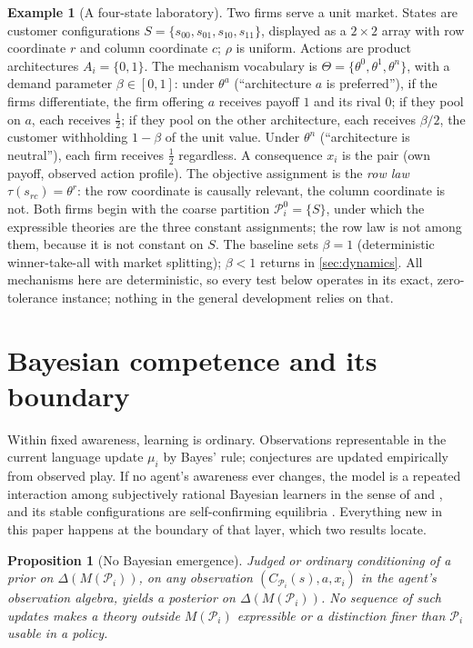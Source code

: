 \documentclass[11pt]{article}
\newtheorem{proposition}[assumption]{Proposition}
\theoremstyle{definition}
\newtheorem{example}{Example}
\begin{document}
\begin{example}[A four-state laboratory]
\label{ex:setup}
Two firms serve a unit market.  States are customer configurations
$S=\{s_{00},s_{01},s_{10},s_{11}\}$, displayed as a $2\times2$ array with row
coordinate $r$ and column coordinate $c$; $\rho$ is uniform.  Actions are
product architectures $A_i=\{0,1\}$.  The mechanism vocabulary is
$\Theta=\{\theta^0,\theta^1,\theta^n\}$, with a demand parameter
$\beta\in[0,1]$: under $\theta^a$ (``architecture $a$ is preferred''), if the
firms differentiate, the firm offering $a$ receives payoff $1$ and its rival
$0$; if they pool on $a$, each receives $\tfrac12$; if they pool on the other
architecture, each receives $\beta/2$, the customer withholding $1-\beta$ of
the unit value.  Under $\theta^n$ (``architecture is neutral''), each firm
receives $\tfrac12$ regardless.  A consequence $x_i$ is the pair (own payoff,
observed action profile).  The objective assignment is the \emph{row law}
$\tau(s_{rc})=\theta^{r}$: the row coordinate is causally relevant, the
column coordinate is not.  Both firms begin with the coarse partition
$\mathcal P_i^0=\{S\}$, under which the expressible theories are the three
constant assignments; the row law is not among them, because it is not
constant on $S$.  The baseline sets $\beta=1$ (deterministic winner-take-all
with market splitting); $\beta<1$ returns in \cref{sec:dynamics}.  All
mechanisms here are deterministic, so every test below operates in its exact,
zero-tolerance instance; nothing in the general development relies on that.
\end{example}
\section{Bayesian competence and its boundary}
\label{sec:bayesian}

Within fixed awareness, learning is ordinary.  Observations representable in
the current language update $\mu_i$ by Bayes' rule; conjectures are updated
empirically from observed play.  If no agent's awareness ever changes, the
model is a repeated interaction among subjectively rational Bayesian
learners in the sense of \citet{KalaiLehrer1993b} and \citet{Ryall2003}, and
its stable configurations are self-confirming equilibria
\citep{FudenbergLevine1993}.  Everything new in this paper happens at the
boundary of that layer, which two results locate.

\begin{proposition}[No Bayesian emergence]
\label{prop:no-emergence}
Judged or ordinary conditioning of a prior on $\Delta(M(\mathcal P_i))$, on any
observation $(C_{\mathcal P_i}(s),a,x_i)$ in the agent's observation algebra,
yields a posterior on $\Delta(M(\mathcal P_i))$.  No sequence of such updates
makes a theory outside $M(\mathcal P_i)$ expressible or a distinction finer
than $\mathcal P_i$ usable in a policy.
\end{proposition}
\end{document}
